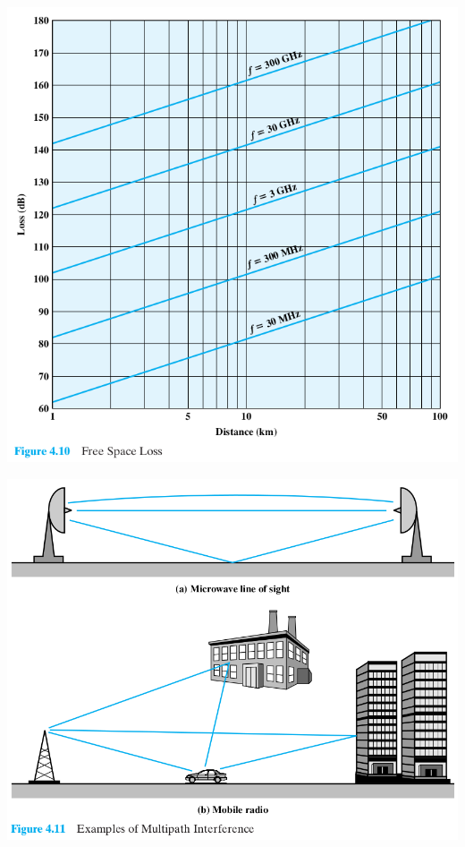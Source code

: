 \documentclass[pdflatex,compress]{beamer}
\begin{document}
\begin{frame}
	\begin{center}
		\includegraphics[height=0.9\textheight]{img/img27}
	\end{center}
\end{frame}

\begin{frame}
	\begin{center}
		\includegraphics[width=0.8\linewidth]{img/img28}
	\end{center}
\end{frame}
\end{document}
